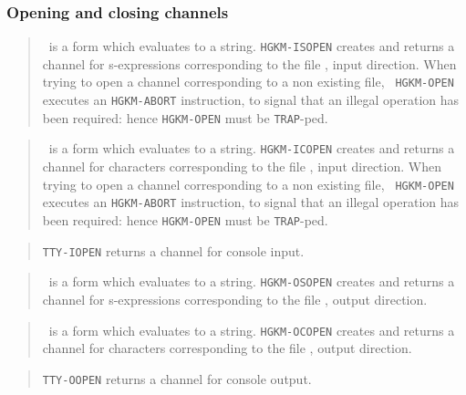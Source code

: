 \subsubsection{Opening and closing channels}

\begin{quote}
	\filena\ is a form which evaluates to a string.
	{\tt HGKM-ISOPEN} creates and returns a channel for s-expressions
	corresponding to the file \filena, input direction.
	When trying to open a channel corresponding to a non existing file, {\tt
	HGKM-OPEN} executes an {\tt HGKM-ABORT} instruction, to signal that an illegal
	operation has been required: hence {\tt HGKM-OPEN} must be {\tt TRAP}-ped.
\end{quote}

\begin{quote}
	\filena\ is a form which evaluates to a string.
	{\tt HGKM-ICOPEN} creates and returns a channel for characters corresponding
	to the file \filena, input direction.
	When trying to open a channel corresponding to a non existing file, {\tt
	HGKM-OPEN} executes an {\tt HGKM-ABORT} instruction, to signal that an illegal
	operation has been required: hence {\tt HGKM-OPEN} must be {\tt TRAP}-ped.
\end{quote}

\begin{quote}
	{\tt TTY-IOPEN} returns a channel for console input.
\end{quote}

\begin{quote}
	\filena\ is a form which evaluates to a string.
	{\tt HGKM-OSOPEN} creates and returns a channel for s-expressions
	corresponding to the file \filena, output direction.
\end{quote}

\begin{quote}
	\filena\ is a form which evaluates to a string.
	{\tt HGKM-OCOPEN} creates and returns a channel for characters corresponding
	to the file \filena, output direction.
\end{quote}

\begin{quote}
	{\tt TTY-OOPEN} returns a channel for console output.
\end{quote}

